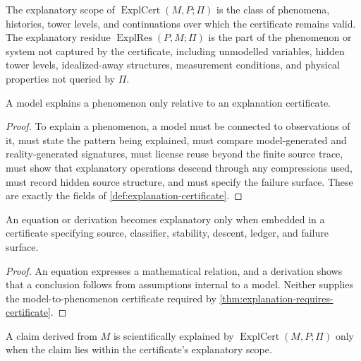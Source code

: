 \begin{definition}
\label{def:explanatory-scope-residue}
The explanatory scope of $\operatorname{ExplCert}(M,P;\Pi)$ is the class of phenomena, histories, tower levels, and continuations over which the certificate remains valid. The explanatory residue $\operatorname{ExplRes}(P,M;\Pi)$ is the part of the phenomenon or system not captured by the certificate, including unmodelled variables, hidden tower levels, idealized-away structures, measurement conditions, and physical properties not queried by $\Pi$.
\end{definition}

\begin{theorem}
\label{thm:explanation-requires-certificate}
A model explains a phenomenon only relative to an explanation certificate.
\end{theorem}

\begin{proof}
To explain a phenomenon, a model must be connected to observations of it, must state the pattern being explained, must compare model-generated and reality-generated signatures, must license reuse beyond the finite source trace, must show that explanatory operations descend through any compressions used, must record hidden source structure, and must specify the failure surface. These are exactly the fields of \autoref{def:explanation-certificate}.
\end{proof}

\begin{corollary}
\label{cor:equations-derivations-not-explanations}
An equation or derivation becomes explanatory only when embedded in a certificate specifying source, classifier, stability, descent, ledger, and failure surface.
\end{corollary}

\begin{proof}
An equation expresses a mathematical relation, and a derivation shows that a conclusion follows from assumptions internal to a model. Neither supplies the model-to-phenomenon certificate required by \autoref{thm:explanation-requires-certificate}.
\end{proof}

\begin{theorem}
\label{thm:explanation-cannot-exceed-scope}
A claim derived from $M$ is scientifically explained by $\operatorname{ExplCert}(M,P;\Pi)$ only when the claim lies within the certificate's explanatory scope.
\end{theorem}

